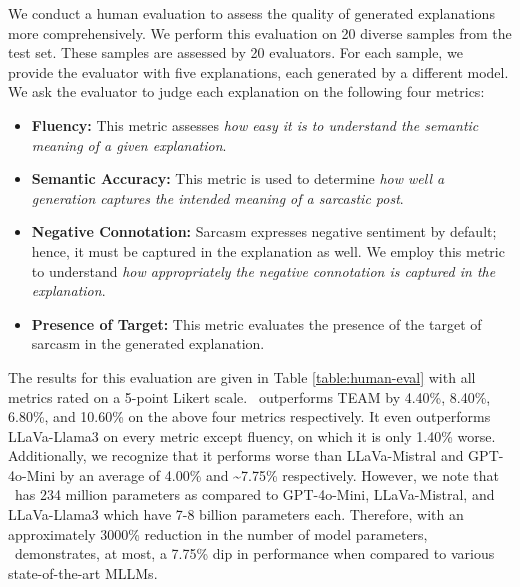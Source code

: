 We conduct a human evaluation to assess the quality of generated explanations more comprehensively. We perform this evaluation on 20 diverse samples from the test set. These samples are assessed by 20 evaluators. For each sample, we provide the evaluator with five explanations, each generated by a different model. We ask the evaluator to judge each explanation on the following four metrics:
\begin{itemize}[leftmargin=*, noitemsep, nolistsep]
    \item{\textbf{Fluency:} This metric assesses \textit{how easy it is to understand the semantic meaning of a given explanation}. %
    }
    \item{\textbf{Semantic Accuracy:} This metric is used to determine \textit{how well a generation captures the intended meaning of a sarcastic post}.} 
    \item{\textbf{Negative Connotation:} Sarcasm expresses negative sentiment by default; hence, it must be captured in the explanation as well. We employ this metric to understand \textit{how appropriately the negative connotation is captured in the explanation}.}
    \item{ \textbf{Presence of Target:} This metric evaluates the presence of the target of sarcasm in the generated explanation. %
    }
\end{itemize}
The results for this evaluation are given in Table \ref{table:human-eval} with all metrics rated on a 5-point Likert scale. \model\ outperforms TEAM by 4.40\%, 8.40\%, 6.80\%, and 10.60\% on the above four metrics respectively. It even outperforms LLaVa-Llama3 on every metric except fluency, on which it is only 1.40\% worse. Additionally, we recognize that it performs worse than LLaVa-Mistral and GPT-4o-Mini by an average of 4.00\% and \textasciitilde 7.75\% respectively. However, we note that \model\ has 234 million parameters as compared to GPT-4o-Mini, LLaVa-Mistral, and LLaVa-Llama3 which have 7-8 billion parameters each. Therefore, with an approximately 3000\% reduction in the number of model parameters, \model\ demonstrates, at most, a 7.75\% dip in performance when compared to various state-of-the-art MLLMs. 


